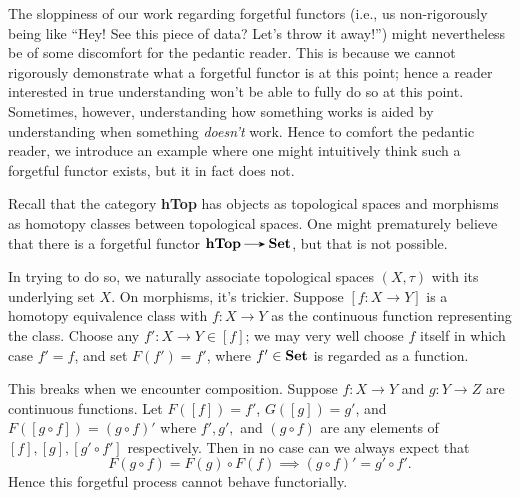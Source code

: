     The sloppiness of our work regarding forgetful functors (i.e., us non-rigorously 
    being like ``Hey! See this piece of data? Let's throw it away!'')
    might nevertheless be of some discomfort for the pedantic reader.
    This is because we cannot rigorously demonstrate what a forgetful functor is at 
    this point; hence a reader interested in true understanding won't be able to fully 
    do so at this point. Sometimes, however, understanding how something works is aided by 
    understanding when something \emph{doesn't} work.
    Hence to comfort the pedantic reader, we introduce an example where one might 
    intuitively think such a forgetful functor exists, but it in fact does not. 
    
    \begin{example}
        Recall that the category \textbf{hTop} has objects as topological spaces 
        and morphisms as homotopy classes between topological spaces. One might 
        prematurely believe that there is a forgetful functor $\textbf{hTop} \to \Set$, 
        but that is not possible.

        In trying to do so, we naturally associate topological spaces $(X, \tau)$ with its 
        underlying set $X$. On morphisms, it's trickier. Suppose $[f: X \to Y]$ is  a
        homotopy equivalence class with $f: X \to Y$ as the continuous function representing 
        the class. Choose any $f': X \to Y \in [f]$;  we may very well choose $f$ itself 
        in which case $f' = f$, and set $F(f') = f'$, where $f' \in \operatorname{\mathbf{Set}}$ is regarded 
        as a function. 

        This breaks when we encounter composition. Suppose $f: X \to Y$ and $g: Y \to Z$ 
        are continuous functions. Let $F([f]) =f'$, $G([g]) = g'$, 
        and $F([g \circ  f]) = (g \circ f)'$ where $f', g',$ and $(g\circ f)$ are any 
        elements of $[f], [g], [g' \circ f ']$ respectively.
        Then in no case can we always expect that 
        \[
            F(g \circ f) = F(g) \circ F(f) \implies (g \circ f)' = g' \circ f'.  
        \]
        Hence this forgetful process cannot behave functorially.
    \end{example}

